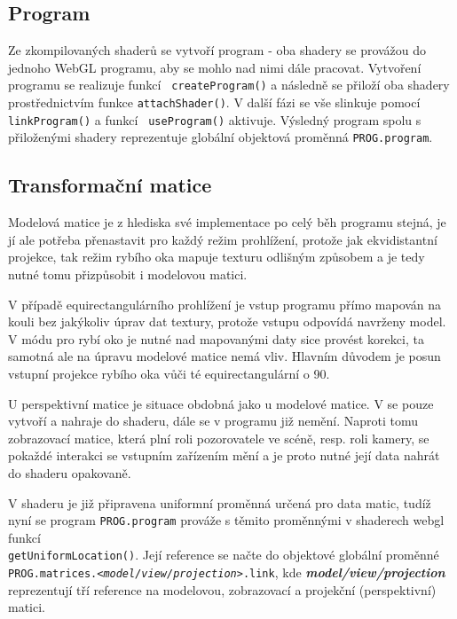 \subsection{Program}
Ze zkompilovaných shaderů se vytvoří program -  oba shadery se provážou  do jednoho WebGL programu, aby se mohlo nad nimi dále pracovat. Vytvoření programu se realizuje funkcí \texttt{ createProgram()} a následně se přiloží oba shadery  prostřednictvím funkce \texttt{attachShader()}. V další fázi se vše slinkuje pomocí \texttt{linkProgram()} a funkcí \texttt{ useProgram()} aktivuje. Výsledný program spolu s přiloženými shadery reprezentuje globální objektová proměnná \texttt{PROG.program}.


\subsection{Transformační matice}
Modelová matice je z hlediska své implementace po celý běh programu stejná, je jí ale potřeba přenastavit pro každý režim prohlížení, protože jak ekvidistantní projekce, tak režim rybího oka mapuje texturu odlišným způsobem a je tedy nutné tomu přizpůsobit i modelovou matici.

V případě equirectangulárního prohlížení je vstup programu přímo mapován na kouli bez jakýkoliv úprav dat textury, protože vstupu odpovídá navrženy model. V módu pro rybí oko je nutné nad mapovanými daty sice provést korekci, ta samotná  ale na úpravu modelové matice nemá vliv. Hlavním důvodem je posun vstupní projekce rybího oka vůči té equirectangulární o 90\degree.

U perspektivní matice je situace obdobná jako u modelové matice. V \texttt{\setupProgram} se pouze vytvoří a nahraje do shaderu, dále se v programu již nemění. Naproti tomu zobrazovací matice, která plní roli pozorovatele ve scéně, resp. roli kamery, se pokaždé interakci se vstupním zařízením  mění a je proto nutné její data nahrát do shaderu opakovaně. 

V shaderu  je již připravena uniformní proměnná určená pro data matic, tudíž nyní se program \texttt{PROG.program} prováže s těmito proměnnými v shaderech webgl funkcí \\\texttt{getUniformLocation()}. Její reference se načte do objektové globální proměnné \\\texttt{PROG.matrices.\textit{<model/view/projection>}.link}, kde \textit{\textbf{model/view/projection}} reprezentují tří reference na modelovou, zobrazovací a projekční (perspektivní) matici.


